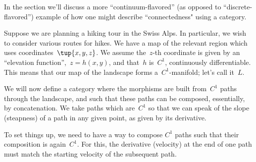 In the section we'll discuss a more ``continuum-flavored'' (as opposed to ``discrete-flavored'') example of how one might describe ``connectedness" using a category. 


Suppose we are planning a hiking tour in the Swiss Alps. In particular, we wish to consider various routes for hikes. We have a map of the relevant region which uses coordinates~$\tup{x, y, z}$. We assume the~$z$-th coordinate is given by an ``elevation function'',~$z = h(x,y)$, and that~$h$ is~$C^1$,  continuously differentiable. This means that our map of the landscape forms a~$C^1$-manifold; let's call it~$L$. 



We will now define a category where the morphisms are built from~$C^1$ paths through the landscape, and such that these paths can be composed, essentially, by concatenation. We take paths which are~$C^1$ so that we can speak of the slope (steapness) of a path in any given point, as given by its derivative. 

%
%



To set things up, we need to have a way to compose $C^1$ paths such that their composition is again~$C^1$. For this, the derivative (velocity) at the end of one path must match the starting velocity of the subsequent path.

